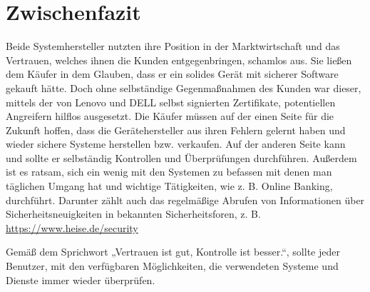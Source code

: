 \section{Zwischenfazit}
Beide Systemhersteller nutzten ihre Position in der Marktwirtschaft und das Vertrauen, welches ihnen die Kunden entgegenbringen, schamlos aus. Sie ließen dem Käufer in dem Glauben, dass er ein solides Gerät mit sicherer Software gekauft hätte. Doch ohne selbständige Gegenmaßnahmen des Kunden war dieser, mittels der von Lenovo und DELL selbst signierten Zertifikate, potentiellen Angreifern hilflos ausgesetzt. Die Käufer müssen auf der einen Seite für die Zukunft hoffen, dass die Gerätehersteller aus ihren Fehlern gelernt haben und wieder sichere Systeme herstellen bzw. verkaufen. Auf der anderen Seite kann und sollte er selbständig Kontrollen und Überprüfungen durchführen. Außerdem ist es ratsam, sich ein wenig mit den Systemen zu befassen mit denen man täglichen Umgang hat und wichtige Tätigkeiten, wie z. B. Online Banking, durchführt. Darunter zählt auch das regelmäßige Abrufen von Informationen über Sicherheitsneuigkeiten in bekannten Sicherheitsforen, z. B. \url{https://www.heise.de/security}

Gemäß dem Sprichwort „Vertrauen ist gut, Kontrolle ist besser.“, sollte jeder Benutzer, mit den verfügbaren Möglichkeiten, die verwendeten Systeme und Dienste immer wieder überprüfen.
